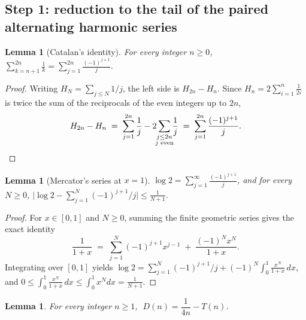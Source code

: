 \documentclass[11pt]{article}
\theoremstyle{plain}
\newtheorem{lemma}[theorem]{Lemma}
\theoremstyle{definition}
\theoremstyle{remark}
\numberwithin{equation}{section}
\begin{document}
\subsection{Step 1: reduction to the tail of the paired alternating harmonic series}

\begin{lemma}[Catalan's identity]
\label{lem:catalan}
For every integer $n \ge 0$, $\displaystyle \sum_{k=n+1}^{2n} \frac1k
= \sum_{j=1}^{2n} \frac{(-1)^{j+1}}{j}$.
\end{lemma}

\begin{proof}
Writing $H_N = \sum_{j \le N} 1/j$, the left side is $H_{2n} - H_n$. Since
$H_n = 2\sum_{i=1}^{n} \frac{1}{2i}$ is twice the sum of the reciprocals of the even integers up
to $2n$,
\[
  H_{2n} - H_n \;=\; \sum_{j=1}^{2n} \frac1j - 2\!\!\sum_{\substack{j \le 2n \\ j \text{ even}}}\!\! \frac1j
  \;=\; \sum_{j=1}^{2n} \frac{(-1)^{j+1}}{j}. \qedhere
\]
\end{proof}

\begin{lemma}[Mercator's series at $x=1$]
\label{lem:mercator}
$\displaystyle \log 2 = \sum_{j=1}^{\infty} \frac{(-1)^{j+1}}{j}$, and for every $N \ge 0$,
$\bigl| \log 2 - \sum_{j=1}^{N} (-1)^{j+1}/j \bigr| \le \frac{1}{N+1}$.
\end{lemma}

\begin{proof}
For $x \in [0,1]$ and $N \ge 0$, summing the finite geometric series gives the exact identity
\[
  \frac{1}{1+x} \;=\; \sum_{j=1}^{N} (-1)^{j+1} x^{j-1} \;+\; \frac{(-1)^N x^N}{1+x}.
\]
Integrating over $[0,1]$ yields
$\log 2 = \sum_{j=1}^{N} (-1)^{j+1}/j + (-1)^N \int_0^1 \frac{x^N}{1+x}\,dx$, and
$0 \le \int_0^1 \frac{x^N}{1+x}\,dx \le \int_0^1 x^N dx = \frac{1}{N+1}$.
\end{proof}

\begin{lemma}
\label{lem:step1}
For every integer $n \ge 1$, $\;D(n) = \dfrac{1}{4n} - T(n)$.
\end{lemma}
\end{document}
